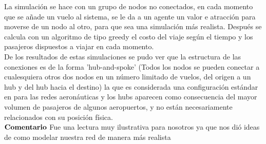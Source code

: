 \documentclass[12pt]{extreport}
\begin{document}
	La simulación se hace con un grupo de nodos no conectados, en cada momento que se añade un vuelo al sistema, se le da a un agente un valor e atracción para moverse de un nodo al otro, para que sea una simulación más realista. Después se calcula con un algoritmo de tipo greedy el costo del viaje según el tiempo y los pasajeros dispuestos a viajar en cada momento.\\
	
	De los resultados de estas simulaciones se pudo ver que la estructura de las conexiones es de la forma 'hub-and-spoke' (Todos los nodos se pueden conectar a cualesquiera otros dos nodos en un número limitado de vuelos, del origen a un hub y del hub hacia el destino) la que es considerada una configuración estándar en para las redes aeronáuticas y los hubs aparecen como consecuencia
	del mayor volumen de pasajeros de algunos aeropuertos, y
	no están necesariamente relacionados con su posición física.\\ 
	
	$\bf{Comentario}$ Fue una lectura muy ilustrativa para nosotros ya que nos dió ideas de como modelar nuestra red de manera más realista
	
\end{document}
